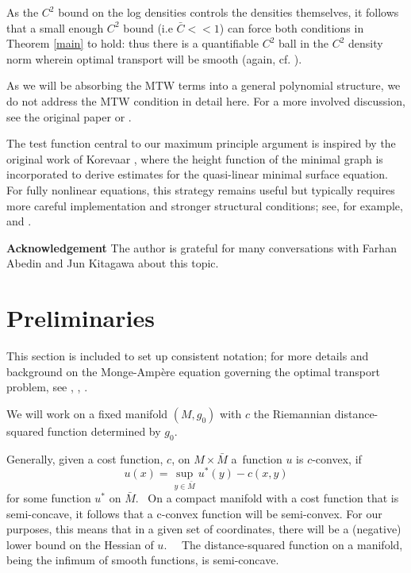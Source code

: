 \documentclass[11pt,letterpaper]{amsart}%
\numberwithin{equation}{section}
\begin{document}
As the $C^2$ bound on the log densities controls the densities themselves, it follows that a small enough $C^2$ bound (i.e $\bar{C}<<1$) can force both conditions in Theorem \ref{main} to hold: thus there is a quantifiable $C^2$ ball in the $C^2$ density norm wherein optimal transport will be smooth (again, cf.  \cite[Corollary 2.2]{CF}).

As we will be absorbing the MTW terms into a general polynomial structure, we do not address the MTW condition in detail here. For a more involved discussion, see the original paper \cite{MTW} or \cite[Chapter 12]{Villani}.

The test function central to our maximum principle argument is inspired by the original work of Korevaar \cite{K}, where the height function of the minimal graph is incorporated to derive estimates for the quasi-linear minimal surface equation. For fully nonlinear equations, this strategy remains useful but typically requires more careful implementation and stronger structural conditions; see, for example, \cite{WY_L} and \cite{BWW}.

\textbf{Acknowledgement} The author is grateful for many conversations with  Farhan Abedin and Jun Kitagawa about this topic.  



\section{Preliminaries}

This section is included to set up consistent notation; for more details and
background on the Monge-Amp\`ere equation governing the optimal transport problem, see \cite{Brenier}, \cite{McCann}, \cite{MTW}.  

We will work on a fixed manifold $\left(  M,g_{0}\right)  $ with $c$ the
Riemannian distance-squared function determined by $g_{0}.$

Generally, given a cost function, $c$, on $M\times\bar{M}$ a\ function $u$ is $c$-convex, if
\[
u(x)=\sup_{y\in\bar{M}}u^{\ast}(y)-c(x,y)
\]
for some function $u^{\ast}$ on $\bar{M}.$ \ On a compact manifold with a cost
function that is semi-concave, it follows that a c-convex function will be
semi-convex. For our purposes, this means that in a given set of coordinates, there will be a (negative) lower bound on the Hessian of $u$.  \ \ The distance-squared function on a manifold, being the
infimum of smooth functions, is semi-concave. \ 
\end{document}
